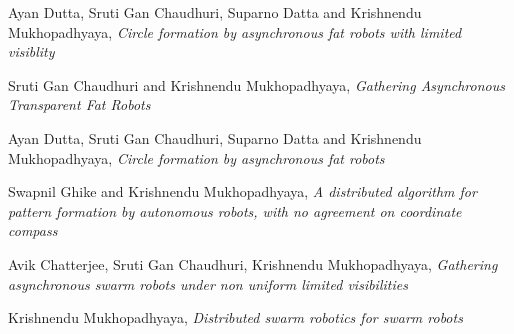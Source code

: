 \documentclass[a4paper,12pt,oneside]{book}
\begin{document}
\begin{thebibliography}{li}
Ayan Dutta, Sruti Gan Chaudhuri, Suparno Datta and Krishnendu Mukhopadhyaya,
{\em Circle formation by asynchronous fat robots with limited visiblity}

Sruti Gan Chaudhuri and Krishnendu Mukhopadhyaya,
{\em Gathering Asynchronous Transparent Fat Robots}

Ayan Dutta, Sruti Gan Chaudhuri, Suparno Datta and Krishnendu Mukhopadhyaya,
{\em Circle formation by asynchronous fat robots}

Swapnil Ghike and Krishnendu Mukhopadhyaya,
{\em A distributed algorithm for pattern formation by autonomous robots, with no agreement on coordinate compass}

Avik Chatterjee, Sruti Gan Chaudhuri, Krishnendu Mukhopadhyaya,
{\em Gathering asynchronous swarm robots under non uniform limited visibilities}

Krishnendu Mukhopadhyaya,
{\em Distributed swarm robotics for swarm robots}
\end{thebibliography}
\end{document}
